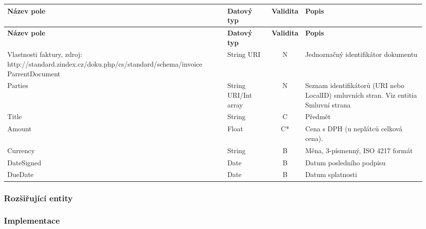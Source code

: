 \begin{center}
\begin{longtable}{lp{20mm}cp{65mm}}
\label{grid_mlmmh} \\
\multicolumn{1}{l}{\textbf{Název pole}} & 
\multicolumn{1}{l}{\textbf{Datový typ}} & 
\multicolumn{1}{l}{\textbf{Validita}} & 
\multicolumn{1}{l}{\textbf{Popis}} \\ \hline 
\endfirsthead
\multicolumn{1}{l}{\textbf{Název pole}} & 
\multicolumn{1}{l}{\textbf{Datový typ}} & 
\multicolumn{1}{l}{\textbf{Validita}} & 
\multicolumn{1}{l}{\textbf{Popis}} \\ \hline 
\hline
\endhead
\endfoot
\caption{Vlastnosti faktury, zdroj:\\http://standard.zindex.cz/doku.php/cs/standard/schema/invoice}
\endlastfoot
ParrentDocument & String URI & N & Jednoznačný identifikátor dokumentu \\
Parties & String URI/Int array & N & Seznam identifikátorů (URI nebo LocalID) smluvních stran. Viz entitia Smluvní strana \\
\rowcolor{validateC}Title & String & C & Předmět \\
\rowcolor{validateC}Amount & Float & C* & Cena s DPH (u neplátců celková cena). \\
\rowcolor{validateB}Currency & String & B & Měna, 3-písmenný, ISO 4217 formát \\
\rowcolor{validateB}DateSigned & Date & B & Datum posledního podpisu \\
\rowcolor{validateB}DueDate & Date & B & Datum splatnosti \\
\end{longtable}
\end{center}

\subsubsection*{Rozšiřující entity}

\subsubsection*{Implementace}

